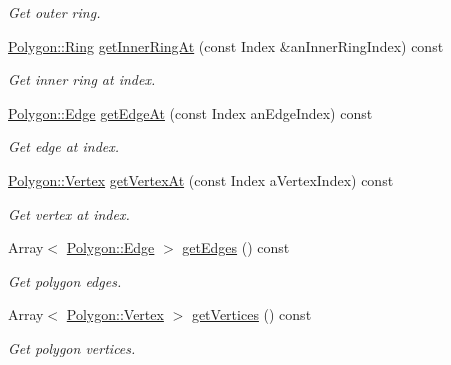\begin{DoxyCompactItemize}
\begin{DoxyCompactList}\small\item\em Get outer ring. \end{DoxyCompactList}\item 
\hyperlink{classostk_1_1math_1_1geom_1_1d2_1_1objects_1_1_polygon_a2cfc117e0bd669946a670640eae4ee4c}{Polygon\+::\+Ring} \hyperlink{classostk_1_1math_1_1geom_1_1d2_1_1objects_1_1_polygon_af1974ca25ea35ce4857dcac525f1180c}{get\+Inner\+Ring\+At} (const Index \&an\+Inner\+Ring\+Index) const
\begin{DoxyCompactList}\small\item\em Get inner ring at index. \end{DoxyCompactList}\item 
\hyperlink{classostk_1_1math_1_1geom_1_1d2_1_1objects_1_1_polygon_a85e5c92944c126a62464874b5a6ba490}{Polygon\+::\+Edge} \hyperlink{classostk_1_1math_1_1geom_1_1d2_1_1objects_1_1_polygon_a247cba455e33ab1a05c43de43c27ba48}{get\+Edge\+At} (const Index an\+Edge\+Index) const
\begin{DoxyCompactList}\small\item\em Get edge at index. \end{DoxyCompactList}\item 
\hyperlink{classostk_1_1math_1_1geom_1_1d2_1_1objects_1_1_polygon_a2fdf6254b42f087bd9cd0b8b0d7df91c}{Polygon\+::\+Vertex} \hyperlink{classostk_1_1math_1_1geom_1_1d2_1_1objects_1_1_polygon_af3eff08fe9f9c74c5d9aebe7fb5f888f}{get\+Vertex\+At} (const Index a\+Vertex\+Index) const
\begin{DoxyCompactList}\small\item\em Get vertex at index. \end{DoxyCompactList}\item 
Array$<$ \hyperlink{classostk_1_1math_1_1geom_1_1d2_1_1objects_1_1_polygon_a85e5c92944c126a62464874b5a6ba490}{Polygon\+::\+Edge} $>$ \hyperlink{classostk_1_1math_1_1geom_1_1d2_1_1objects_1_1_polygon_ac0c151b62ba0798eb4d86b2458e6d8b0}{get\+Edges} () const
\begin{DoxyCompactList}\small\item\em Get polygon edges. \end{DoxyCompactList}\item 
Array$<$ \hyperlink{classostk_1_1math_1_1geom_1_1d2_1_1objects_1_1_polygon_a2fdf6254b42f087bd9cd0b8b0d7df91c}{Polygon\+::\+Vertex} $>$ \hyperlink{classostk_1_1math_1_1geom_1_1d2_1_1objects_1_1_polygon_a04a97204d397a1c7a919ebf4d73fb537}{get\+Vertices} () const
\begin{DoxyCompactList}\small\item\em Get polygon vertices. \end{DoxyCompactList}\item 

\end{DoxyCompactItemize}
